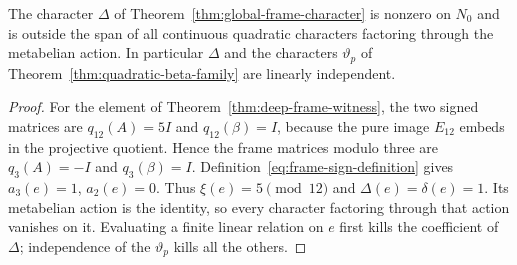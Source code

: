 \begin{corollary}\label{cor:frame-character-nonzero}
The character $\Delta$ of Theorem~\ref{thm:global-frame-character}
is nonzero on $N_0$ and is outside the span of all continuous quadratic
characters factoring through the metabelian action. In particular
$\Delta$ and the characters $\vartheta_p$ of
Theorem~\ref{thm:quadratic-beta-family} are linearly independent.
\end{corollary}

\begin{proof}
For the element of Theorem~\ref{thm:deep-frame-witness}, the two
signed matrices are $q_{12}(A)=5I$ and $q_{12}(\beta)=I$, because
the pure image $E_{12}$ embeds in the projective quotient. Hence the
frame matrices modulo three are $q_3(A)=-I$ and
$q_3(\beta)=I$. Definition~\eqref{eq:frame-sign-definition} gives
$a_3(e)=1$, $a_2(e)=0$. Thus $\xi(e)=5\pmod{12}$ and
$\Delta(e)=\delta(e)=1$. Its metabelian action is the identity,
so every character factoring through that action vanishes on it.
Evaluating a finite linear relation on $e$ first kills the coefficient
of $\Delta$; independence of the $\vartheta_p$ kills all the others.
\end{proof}
